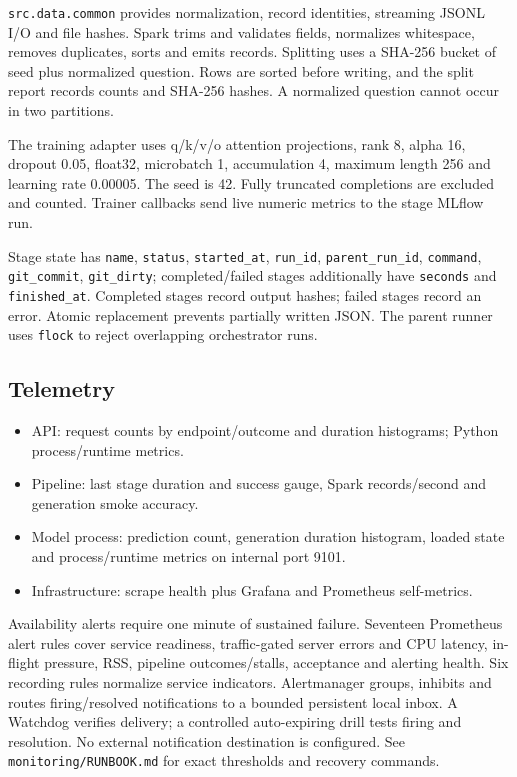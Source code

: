 \documentclass[11pt,a4paper]{article}
\begin{document}
\texttt{src.\allowbreak{}data.\allowbreak{}common} provides normalization, record identities, streaming JSONL I/O and file hashes. Spark trims and validates fields, normalizes whitespace, removes duplicates, sorts and emits records. Splitting uses a SHA-256 bucket of seed plus normalized question. Rows are sorted before writing, and the split report records counts and SHA-256 hashes. A normalized question cannot occur in two partitions.

The training adapter uses q/k/v/o attention projections, rank 8, alpha 16, dropout 0.05, float32, microbatch 1, accumulation 4, maximum length 256 and learning rate 0.00005. The seed is 42. Fully truncated completions are excluded and counted. Trainer callbacks send live numeric metrics to the stage MLflow run.

Stage state has \texttt{name}, \texttt{status}, \texttt{started\_\allowbreak{}at}, \texttt{run\_\allowbreak{}id}, \texttt{parent\_\allowbreak{}run\_\allowbreak{}id}, \texttt{command}, \texttt{git\_\allowbreak{}commit}, \texttt{git\_\allowbreak{}dirty}; completed/failed stages additionally have \texttt{seconds} and \texttt{finished\_\allowbreak{}at}. Completed stages record output hashes; failed stages record an error. Atomic replacement prevents partially written JSON. The parent runner uses \texttt{flock} to reject overlapping orchestrator runs.

\subsection*{Telemetry}
\begin{itemize}
\item API: request counts by endpoint/outcome and duration histograms; Python process/runtime metrics.
\item Pipeline: last stage duration and success gauge, Spark records/second and generation smoke accuracy.
\item Model process: prediction count, generation duration histogram, loaded state and process/runtime metrics on internal port 9101.
\item Infrastructure: scrape health plus Grafana and Prometheus self-metrics.
\end{itemize}
Availability alerts require one minute of sustained failure. Seventeen Prometheus alert rules cover service readiness, traffic-gated server errors and CPU latency, in-flight pressure, RSS, pipeline outcomes/stalls, acceptance and alerting health. Six recording rules normalize service indicators. Alertmanager groups, inhibits and routes firing/resolved notifications to a bounded persistent local inbox. A Watchdog verifies delivery; a controlled auto-expiring drill tests firing and resolution. No external notification destination is configured. See \texttt{monitoring/\allowbreak{}RUNBOOK.\allowbreak{}md} for exact thresholds and recovery commands.
\end{document}
